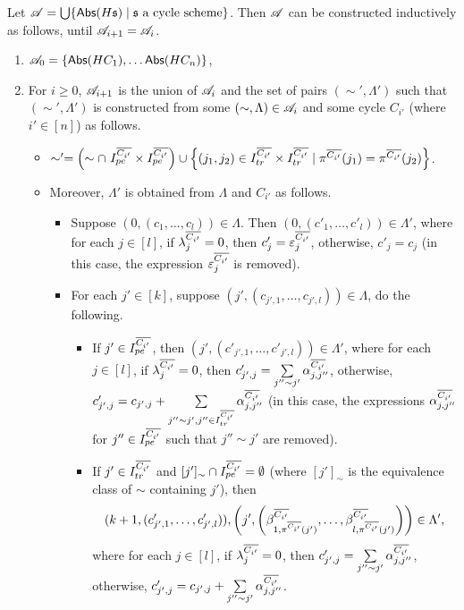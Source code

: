 Let $\mathscr{A}=\bigcup \{\mathsf{Abs}(H{\mathfrak{s} }) \mid {\mathfrak{s} } \mbox{ a cycle scheme}\}$. Then $\mathscr{A}$ can be constructed inductively as follows, until $\mathscr{A}_{i+1}= \mathscr{A}_i$. 
\begin{enumerate}
\item $\mathscr{A}_0 = \{\mathsf{Abs}(HC_1), \ldots \mathsf{Abs}(HC_n)\}$,

\item For $i \ge 0$, $\mathscr{A}_{i+1}$ is the union of $\mathscr{A}_i$ and the set of pairs $(\sim', \Lambda')$ such that $(\sim', \Lambda')$ is constructed from some $(\sim, \Lambda) \in \mathscr{A}_i$ and some cycle $C_{i'}$ (where $ i' \in [n]$) as follows.
\begin{itemize}
\item $\sim' = \left(\sim \cap\ I^{\circled{C_{i'}}}_{pe} \times I^{\circled{C_{i'}}}_{pe} \right) \cup \left\{(j_1,j_2) \in I^{\circled{C_{i'}}}_{tr} \times I^{\circled{C_{i'}}}_{tr} \mid \pi^{\circled{C_{i'}}}(j_1) = \pi^{\circled{C_{i'}}}(j_2)\right\}$. 
%
\item Moreover, $\Lambda'$ is obtained from $\Lambda$ and $C_{i'}$ as follows. 
\begin{itemize}
\item Suppose $(0, (c_1, \dots, c_l)) \in \Lambda$. Then $(0, (c'_1, \dots, c'_l)) \in \Lambda'$, where for each $j \in [l]$, if $\lambda^{\overline{C_{i'}}}_j = 0$, then $c'_j = \varepsilon^{\overline{C_{i'}}}_{j}$, otherwise, $c'_j = c_j$ (in this case, the expression $\varepsilon^{\overline{C_{i'}}}_{j}$ is removed).  
%
\item For each $j' \in [k]$, suppose $(j', (c_{j',1}, \dots, c_{j',l})) \in \Lambda$, do the following. 
\begin{itemize}
\item If $j' \in I^{\overline{C_{i'}}}_{pe}$, then $(j', (c'_{j', 1}, \dots, c'_{j', l})) \in \Lambda'$,  where for each $j \in [l]$, if $\lambda^{\overline{C_{i'}}}_j = 0$, then $c'_{j', j}= \sum \limits_{j'' \sim j'} \alpha^{\overline{C_{i'}}}_{j, j''}$, otherwise, $c'_{j', j} = c_{j',j} + \sum \limits_{j'' \sim j', j'' \in I^{\overline{C_{i'}}}_{tr}} \alpha^{\overline{C_{i'}}}_{j, j''}$ (in this case, the expressions $\alpha^{\overline{C_{i'}}}_{j,j''}$ for $j'' \in  I^{\overline{C_{i'}}}_{pe}$ such that $j'' \sim j'$ are removed).
%
\item If $j' \in I^{\overline{C_{i'}}}_{tr}$ and $[j']_\sim \cap I^{\overline{C_{i'}}}_{pe} = \emptyset$ (where $[j']_\sim$ is the equivalence class of $\sim$ containing $j'$), then 
$$(k+1, (c'_{j', 1}, \dots, c'_{j', l})), \left(j', \left(\beta^{\overline{C_{i'}}}_{1, \pi^{\overline{C_{i'}}}(j')}, \dots, \beta^{\overline{C_{i'}}}_{l, \pi^{\overline{C_{i'}}}(j')} \right) \right) \in \Lambda',$$ 
where for each $j \in [l]$, if $\lambda^{\overline{C_{i'}}}_j = 0$, then $c'_{j', j}= \sum \limits_{j'' \sim j'} \alpha^{\overline{C_{i'}}}_{j, j''} $, otherwise, $c'_{j', j} = c_{j',j} +  \sum \limits_{j'' \sim j'} \alpha^{\overline{C_{i'}}}_{j, j''}$.
%
\end{itemize}


\end{itemize}
\end{itemize}
\end{enumerate}
